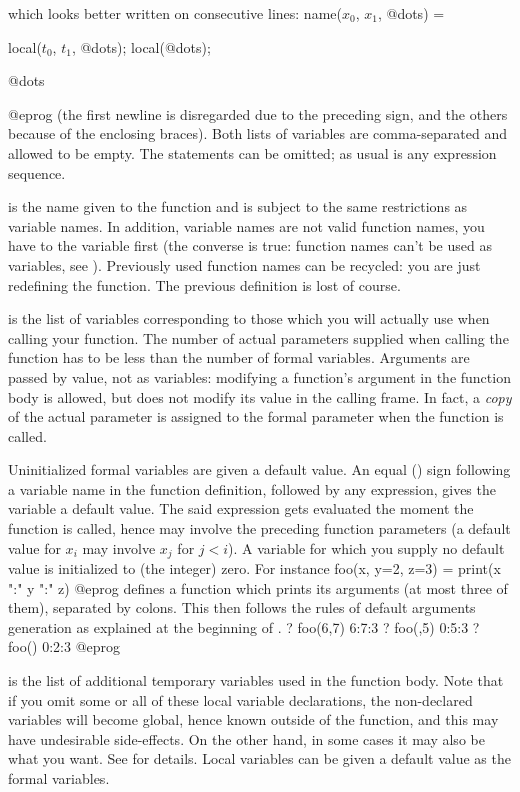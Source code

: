 \kbd{);} 

\noindent which looks better written on consecutive lines:
\bprogpart
name($x_0$, $x_1$, @dots) =
{
  local($t_0$, $t_1$, @dots);
  local(@dots);

  @dots
}
@eprog \noindent
(the first newline is disregarded due to the preceding \kbd{=} sign, and the
others because of the enclosing braces). Both lists of variables are
comma-separated and allowed to be empty. The  statements can be
omitted; as usual  is any expression sequence.

\noindent {} is the name given to the function and is subject to the
same restrictions as variable names. In addition, variable names are not
valid function names, you have to  the variable first (the converse
is true: function names can't be used as variables, see ).
Previously used function names can be recycled: you are just redefining the
function. The previous definition is lost of course.

\noindent {} is the list of variables
corresponding to those which you will actually use when calling your
function. The number of actual parameters supplied when calling the function
has to be less than the number of formal variables. Arguments are passed by
value, not as variables: modifying a function's argument in the function
body is allowed, but does not modify its value in the calling frame. In fact,
a \emph{copy} of the actual parameter is assigned to the formal parameter
when the function is called.

Uninitialized formal variables are given a default value. An equal (\kbd{=})
sign following a variable name in the function definition, followed by any
expression, gives the variable a default value. The said expression gets
evaluated the moment the function is called, hence may involve the preceding
function parameters (a default value for $x_i$ may involve $x_j$ for $j <
i$). A variable for which you supply no default value is initialized to 
(the integer) zero. For instance
\bprog
  foo(x, y=2, z=3) = print(x ":" y ":" z)
@eprog
\noindent defines a function which prints its arguments (at most three of
them), separated by colons. This then follows the rules of default
arguments generation as explained at the beginning of
.
\bprog
? foo(6,7)
6:7:3
? foo(,5)
0:5:3
? foo()
0:2:3
@eprog

\noindent {} is the list of additional temporary
variables used in the function body. Note that if you omit some or all of
these local variable declarations, the non-declared variables will become
global, hence known outside of the function, and this may have undesirable
side-effects. On the other hand, in some cases it may also be what you want.
See  for details. Local variables can be given a default
value as the formal variables.

